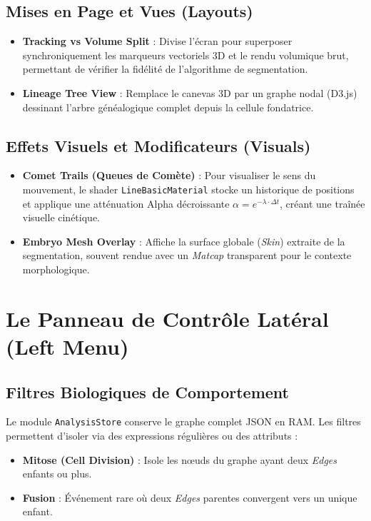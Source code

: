 \subsection{Mises en Page et Vues (Layouts)}
\begin{itemize}
    \item \textbf{Tracking vs Volume Split} : Divise l'écran pour superposer synchroniquement les marqueurs vectoriels 3D et le rendu volumique brut, permettant de vérifier la fidélité de l'algorithme de segmentation.
    \item \textbf{Lineage Tree View} : Remplace le canevas 3D par un graphe nodal (D3.js) dessinant l'arbre généalogique complet depuis la cellule fondatrice.
\end{itemize}

\subsection{Effets Visuels et Modificateurs (Visuals)}
\begin{itemize}
    \item \textbf{Comet Trails (Queues de Comète)} : Pour visualiser le sens du mouvement, le shader \texttt{LineBasicMaterial} stocke un historique de positions et applique une atténuation Alpha décroissante $\alpha = e^{-\lambda \cdot \Delta t}$, créant une traînée visuelle cinétique.
    \item \textbf{Embryo Mesh Overlay} : Affiche la surface globale (\textit{Skin}) extraite de la segmentation, souvent rendue avec un \textit{Matcap} transparent pour le contexte morphologique.
\end{itemize}

\section{Le Panneau de Contrôle Latéral (Left Menu)}

\subsection{Filtres Biologiques de Comportement}
Le module \texttt{AnalysisStore} conserve le graphe complet JSON en RAM. Les filtres permettent d'isoler via des expressions régulières ou des attributs :

\begin{itemize}
    \item \textbf{Mitose (Cell Division)} : Isole les nœuds du graphe ayant deux \textit{Edges} enfants ou plus.
    \item \textbf{Fusion} : Événement rare où deux \textit{Edges} parentes convergent vers un unique enfant.
\end{itemize}


